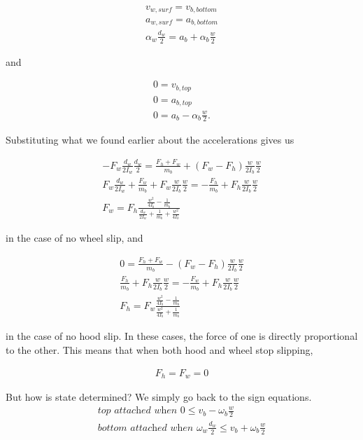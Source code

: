 \documentclass[10pt,letterpaper]{article}
\begin{document}
	\begin{align}
		v_{w,surf} = v_{b,bottom} \nonumber \\
		a_{w,surf} = a_{b,bottom} \nonumber \\
		\alpha_{w} \frac{d_w}{2} = a_{b} + \alpha_{b} \frac{w}{2}
	\end{align}

	and

	\begin{align}
		0 = v_{b,top} \nonumber \\
		0 = a_{b,top} \nonumber \\
		0 = a_{b} - \alpha_{b} \frac{w}{2} .
	\end{align}

	Substituting what we found earlier about the accelerations gives us

	\begin{align}
		- F_w \frac{d_w}{2 I_w} \frac{d_w}{2} = \frac{F_h + F_w}{m_b} + (F_w - F_h) \frac{w}{2 I_b} \frac{w}{2} \nonumber \\
		F_w \frac{d_w}{2 I_w} + \frac{F_w}{m_b} + F_w \frac{w}{2 I_b} \frac{w}{2} = - \frac{F_h}{m_b} + F_h \frac{w}{2 I_b} \frac{w}{2} \nonumber \\
		F_w = F_h \frac{\frac{w^2}{4 I_b} - \frac{1}{m_b}}{\frac{d_w}{2 I_w} + \frac{1}{m_b} + \frac{w^2}{4 I_b}}
	\end{align}

	in the case of no wheel slip, and

	\begin{align}
		0 = \frac{F_h + F_w}{m_b} - (F_w - F_h) \frac{w}{2 I_b} \frac{w}{2} \nonumber \\
		\frac{F_h}{m_b} + F_h \frac{w}{2 I_b} \frac{w}{2} = - \frac{F_w}{m_b} + F_h \frac{w}{2 I_b} \frac{w}{2} \nonumber \\
		F_h = F_w \frac{\frac{w^2}{4 I_b} - \frac{1}{m_b}}{\frac{w^2}{4 I_b} + \frac{1}{m_b}} 
	\end{align}

	in the case of no hood slip. In these cases, the force of one is directly proportional to the other. This means that when both hood and wheel stop slipping,

	\begin{align}
		F_h = F_w = 0
	\end{align}

	But how is state determined? We simply go back to the sign equations.
	\begin{align}
		\textit{top attached when } 0 \leq v_{b} - \omega_{b} \frac{w}{2} \\
		\textit{bottom attached when } \omega_{w} \frac{d_w}{2} \leq v_{b} + \omega_{b} \frac{w}{2}
	\end{align}
\end{document}

